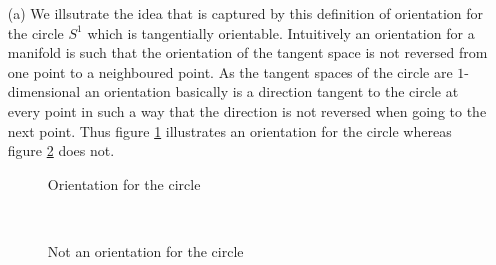 \begin{exa}
\label{exa:orientation}
\begin{enumerate}
\item[(a)]
We illsutrate the idea that is captured by this definition of orientation for the circle $S^{1}$ which is tangentially orientable. Intuitively an orientation for a manifold is such that the orientation of the tangent space is not reversed from one point to a neighboured point. As the tangent spaces of the circle are $1$-dimensional an orientation basically is a direction tangent to the circle at every point in such a way that the direction is not reversed when going to the next point. Thus figure \ref{fig:orcirc} illustrates an orientation for the circle whereas figure \ref{fig:norcirc} does not.
\\
\begin{figure}[h!]
\centering
{}
\caption{Orientation for the circle}
\label{fig:orcirc}
\end{figure}
\\
\begin{figure}[h!]
\centering
{}
\caption{Not an orientation for the circle}
\label{fig:norcirc}
\end{figure}
\\


\end{enumerate}
\end{exa}
